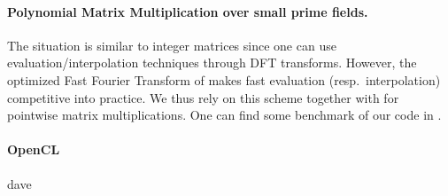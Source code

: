 %
\paragraph{Polynomial Matrix Multiplication over small prime fields.}
%
The situation is similar to integer matrices since one can use
evaluation/interpolation techniques through DFT transforms. However, the
optimized Fast Fourier Transform of \cite{Harvey:2014}  makes fast evaluation
(resp.\ interpolation) competitive into practice. We thus rely on this scheme
together with \fgemm for pointwise matrix multiplications. One can find some
benchmark of our code in \cite{GioLeb14}.

\paragraph{OpenCL}
%
\danger dave
